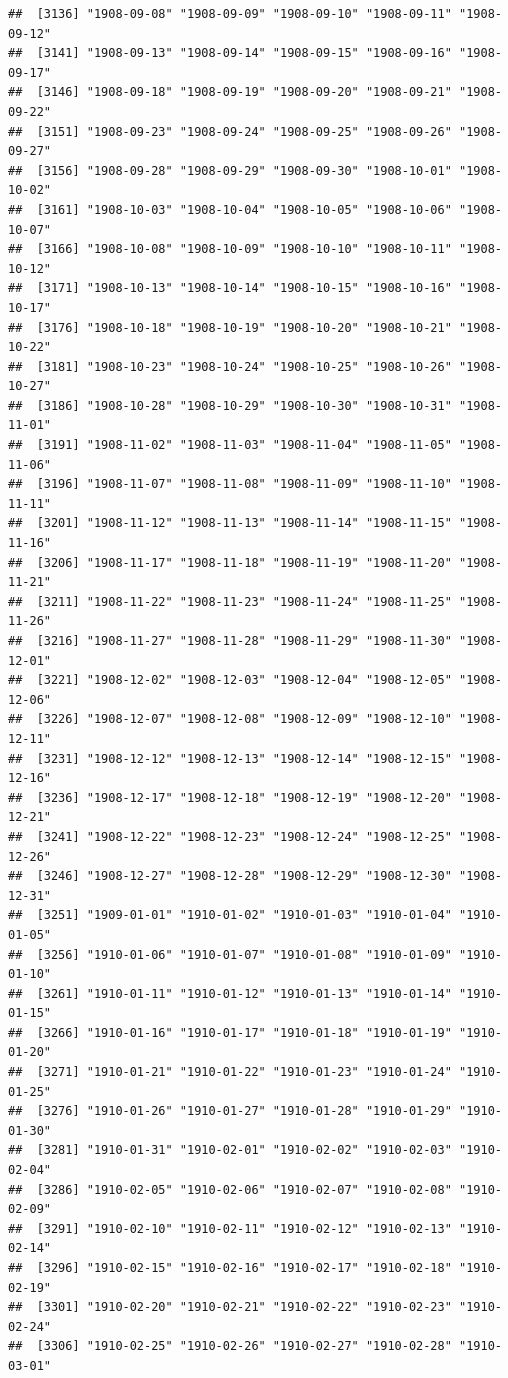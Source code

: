 \documentclass{article}\usepackage[]{graphicx}\usepackage[]{color}
\makeatletter
\newenvironment{kframe}{%
 \def\at@end@of@kframe{}%
 \ifinner\ifhmode%
  \def\at@end@of@kframe{\end{minipage}}%
  \begin{minipage}{\columnwidth}%
 \fi\fi%
 \def\FrameCommand##1{\hskip\@totalleftmargin \hskip-\fboxsep
 \colorbox{shadecolor}{##1}\hskip-\fboxsep
     \hskip-\linewidth \hskip-\@totalleftmargin \hskip\columnwidth}%
 \MakeFramed {\advance\hsize-\width
   \@totalleftmargin\z@ \linewidth\hsize
   \@setminipage}}%
 {\par\unskip\endMakeFramed%
 \at@end@of@kframe}
\newenvironment{knitrout}{}{} %
\makeatother
\begin{document}
\begin{description}
\begin{knitrout}
\begin{kframe}
\begin{verbatim}
##  [3136] "1908-09-08" "1908-09-09" "1908-09-10" "1908-09-11" "1908-09-12"
##  [3141] "1908-09-13" "1908-09-14" "1908-09-15" "1908-09-16" "1908-09-17"
##  [3146] "1908-09-18" "1908-09-19" "1908-09-20" "1908-09-21" "1908-09-22"
##  [3151] "1908-09-23" "1908-09-24" "1908-09-25" "1908-09-26" "1908-09-27"
##  [3156] "1908-09-28" "1908-09-29" "1908-09-30" "1908-10-01" "1908-10-02"
##  [3161] "1908-10-03" "1908-10-04" "1908-10-05" "1908-10-06" "1908-10-07"
##  [3166] "1908-10-08" "1908-10-09" "1908-10-10" "1908-10-11" "1908-10-12"
##  [3171] "1908-10-13" "1908-10-14" "1908-10-15" "1908-10-16" "1908-10-17"
##  [3176] "1908-10-18" "1908-10-19" "1908-10-20" "1908-10-21" "1908-10-22"
##  [3181] "1908-10-23" "1908-10-24" "1908-10-25" "1908-10-26" "1908-10-27"
##  [3186] "1908-10-28" "1908-10-29" "1908-10-30" "1908-10-31" "1908-11-01"
##  [3191] "1908-11-02" "1908-11-03" "1908-11-04" "1908-11-05" "1908-11-06"
##  [3196] "1908-11-07" "1908-11-08" "1908-11-09" "1908-11-10" "1908-11-11"
##  [3201] "1908-11-12" "1908-11-13" "1908-11-14" "1908-11-15" "1908-11-16"
##  [3206] "1908-11-17" "1908-11-18" "1908-11-19" "1908-11-20" "1908-11-21"
##  [3211] "1908-11-22" "1908-11-23" "1908-11-24" "1908-11-25" "1908-11-26"
##  [3216] "1908-11-27" "1908-11-28" "1908-11-29" "1908-11-30" "1908-12-01"
##  [3221] "1908-12-02" "1908-12-03" "1908-12-04" "1908-12-05" "1908-12-06"
##  [3226] "1908-12-07" "1908-12-08" "1908-12-09" "1908-12-10" "1908-12-11"
##  [3231] "1908-12-12" "1908-12-13" "1908-12-14" "1908-12-15" "1908-12-16"
##  [3236] "1908-12-17" "1908-12-18" "1908-12-19" "1908-12-20" "1908-12-21"
##  [3241] "1908-12-22" "1908-12-23" "1908-12-24" "1908-12-25" "1908-12-26"
##  [3246] "1908-12-27" "1908-12-28" "1908-12-29" "1908-12-30" "1908-12-31"
##  [3251] "1909-01-01" "1910-01-02" "1910-01-03" "1910-01-04" "1910-01-05"
##  [3256] "1910-01-06" "1910-01-07" "1910-01-08" "1910-01-09" "1910-01-10"
##  [3261] "1910-01-11" "1910-01-12" "1910-01-13" "1910-01-14" "1910-01-15"
##  [3266] "1910-01-16" "1910-01-17" "1910-01-18" "1910-01-19" "1910-01-20"
##  [3271] "1910-01-21" "1910-01-22" "1910-01-23" "1910-01-24" "1910-01-25"
##  [3276] "1910-01-26" "1910-01-27" "1910-01-28" "1910-01-29" "1910-01-30"
##  [3281] "1910-01-31" "1910-02-01" "1910-02-02" "1910-02-03" "1910-02-04"
##  [3286] "1910-02-05" "1910-02-06" "1910-02-07" "1910-02-08" "1910-02-09"
##  [3291] "1910-02-10" "1910-02-11" "1910-02-12" "1910-02-13" "1910-02-14"
##  [3296] "1910-02-15" "1910-02-16" "1910-02-17" "1910-02-18" "1910-02-19"
##  [3301] "1910-02-20" "1910-02-21" "1910-02-22" "1910-02-23" "1910-02-24"
##  [3306] "1910-02-25" "1910-02-26" "1910-02-27" "1910-02-28" "1910-03-01"

\end{verbatim}
\end{kframe}
\end{knitrout}
\end{description}
\end{document}
